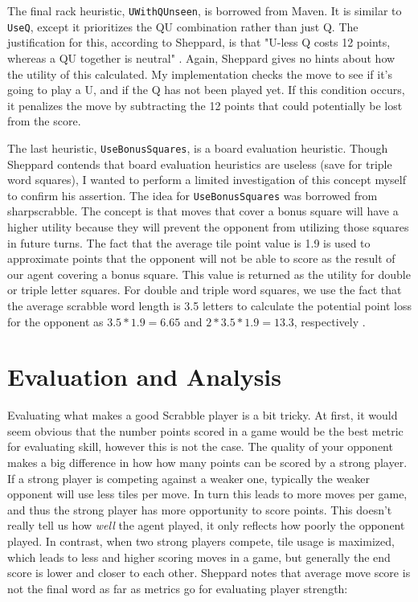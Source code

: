 \documentclass[letterpaper]{article}
\begin{document}
The final rack heuristic, \texttt{UWithQUnseen}, is borrowed from Maven. It is similar to \texttt{UseQ}, except it prioritizes the QU combination rather than just Q. The justification for this, according to Sheppard, is that "U-less Q costs 12 points, whereas a QU together is neutral" \cite{1sheppard2002}. Again, Sheppard gives no hints about how the utility of this calculated. My implementation checks the move to see if it's going to play a U, and if the Q has not been played yet. If this condition occurs, it penalizes the move by subtracting the 12 points that could potentially be lost from the score.

The last heuristic, \texttt{UseBonusSquares}, is a board evaluation heuristic. Though Sheppard contends that board evaluation heuristics are useless (save for triple word squares), I wanted to perform a limited investigation of this concept myself to confirm his assertion. The idea for \texttt{UseBonusSquares} was borrowed from sharpscrabble. The concept is that moves that cover a bonus square will have a higher utility because they will prevent the opponent from utilizing those squares in future turns. The fact that the average tile point value is 1.9 is used to approximate points that the opponent will not be able to score as the result of our agent covering a bonus square. This value is returned as the utility for double or triple letter squares. For double and triple word squares, we use the fact that the average scrabble word length is 3.5 letters to calculate the potential point loss for the opponent as $3.5 * 1.9 = 6.65$ and $2* 3.5 * 1.9 = 13.3$, respectively \cite{sharpscrabble}.


\section{Evaluation and Analysis}
Evaluating what makes a good Scrabble player is a bit tricky. At first, it would seem obvious that the number points scored in a game would be the best metric for evaluating skill, however this is not the case. The quality of your opponent makes a big difference in how how many points can be scored by a strong player. If a strong player is competing against a weaker one, typically the weaker opponent will use less tiles per move. In turn this leads to more moves per game, and thus the strong player has more opportunity to score points. This doesn't really tell us how \emph{well} the agent played, it only reflects how poorly the opponent played. In contrast, when two strong players compete, tile usage is maximized, which leads to less and higher scoring moves in a game, but generally the end score is lower and closer to each other. Sheppard notes that average move score is not the final word as far as metrics go for evaluating player strength:
\end{document}
